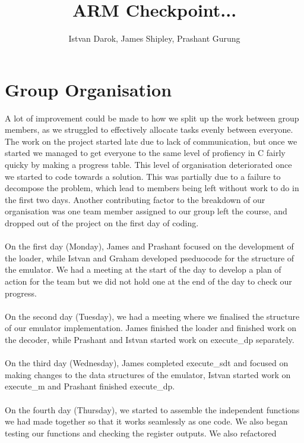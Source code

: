 \documentclass[11pt]{article}
\begin{document}
\title{ARM Checkpoint... }
\author{Istvan Darok, James Shipley, Prashant Gurung}

\maketitle

\section{Group Organisation}

A lot of improvement could be made to how we split up the work between group members, as we
struggled to effectively allocate tasks evenly between everyone. The work on the project started
late due to lack of communication, but once we started we managed to get everyone to the same
level of profiency in C fairly quicky by making a progress table. This level of organisation 
deteriorated once we started to code towards a solution. This was partially due to a failure to 
decompose the problem, which lead to members being left without work to do in the first two days.
Another contributing factor to the breakdown of our organisation was one team member assigned to
our group left the course, and dropped out of the project on the first day of coding.
\\~\\On the first day (Monday), James and Prashant focused on the development of the loader, while Istvan and Graham
developed pseduocode for the structure of the emulator. We had a meeting at the start of the day
to develop a plan of action for the team but we did not hold one at the end of the day to check our progress.
\\~\\On the second day (Tuesday), we had a meeting where we finalised the structure of our emulator implementation.
James finished the loader and finished work on the decoder, while Prashant and Istvan 
started work on execute\_dp separately.
\\~\\On the third day (Wednesday), James completed execute\_sdt and focused on making changes to the data structures of the emulator,
Istvan started work on execute\_m and Prashant finished execute\_dp.
\\~\\On the fourth day (Thursday), we started to assemble the independent functions we had made together so that it works seamlessly 
as one code. We also began testing our functions and checking the register outputs. We also refactored
\end{document}
